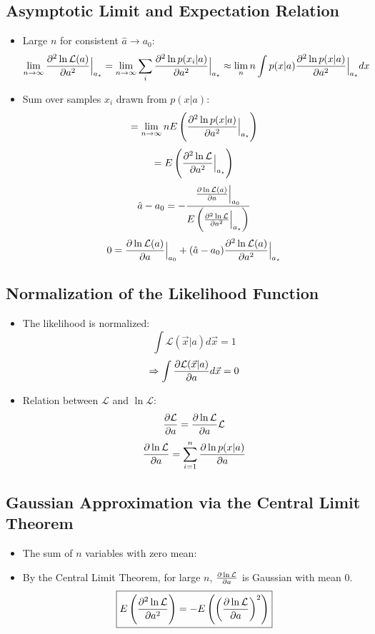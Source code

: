 \subsection{Asymptotic Limit and Expectation Relation}

\begin{itemize}
      \item Large $n$ for consistent $\hat{a} \to a_0$:
            \[ \lim_{n \to \infty} \pdv[2]{\ln \mathcal{L}(a)}{a} \Big|_{a_{\star}} = \lim_{n \to \infty} \sum_i \pdv[2]{\ln p(x_i|a)}{a} \Big|_{a_{\star}} \approx \lim_{n} n \int p(x|a) \pdv[2]{\ln p(x|a)}{a} \Big|_{a_{\star}} dx \]
      \item Sum over samples $x_i$ drawn from $p(x|a)$:
            \[ = \lim_{n \to \infty} n E\left( \pdv[2]{\ln p(x|a)}{a} \Big|_{a_{\star}} \right) \]
            \[ = E \left( \pdv[2]{\ln \mathcal{L}}{a} \Big|_{a_{\star}} \right) \]
            \[ \hat{a} - a_0 = - \frac{\pdv{\ln \mathcal{L}(a)}{a} \Big|_{a_0}}{E\left( \pdv[2]{\ln \mathcal{L}}{a} \Big|_{a_{\star}} \right)} \]
            \[ 0 = \pdv{\ln \mathcal{L}(a)}{a} \Big|_{a_0} + (\hat{a} - a_0) \pdv[2]{\ln \mathcal{L}(a)}{a} \Big|_{a_{\star}} \]
\end{itemize}

\subsection{Normalization of the Likelihood Function}

\begin{itemize}
      \item The likelihood is normalized:
            \[ \int \mathcal{L}(\vec{x}|a) d\vec{x} = 1 \]
            \[ \Rightarrow \int \pdv{\mathcal{L}(\vec{x}|a)}{a} d\vec{x} = 0 \]
      \item Relation between $\mathcal{L}$ and $\ln \mathcal{L}$:
            \[ \pdv{\mathcal{L}}{a} = \pdv{\ln \mathcal{L}}{a} \mathcal{L} \]
            \[ \pdv{\ln \mathcal{L}}{a} = \sum_{i=1}^{n} \pdv{\ln p(x|a)}{a} \]
\end{itemize}

\subsection{Gaussian Approximation via the Central Limit Theorem}

\begin{itemize}
      \item The sum of $n$ variables with zero mean:
      \item By the Central Limit Theorem, for large $n$, $\pdv{\ln \mathcal{L}}{a}$ is Gaussian with mean 0.
            \[ \boxed{E\left(\pdv[2]{\ln \mathcal{L}}{a} \right) = - E \left( \left( \pdv{\ln \mathcal{L}}{a} \right)^2 \right) } \]
\end{itemize}

